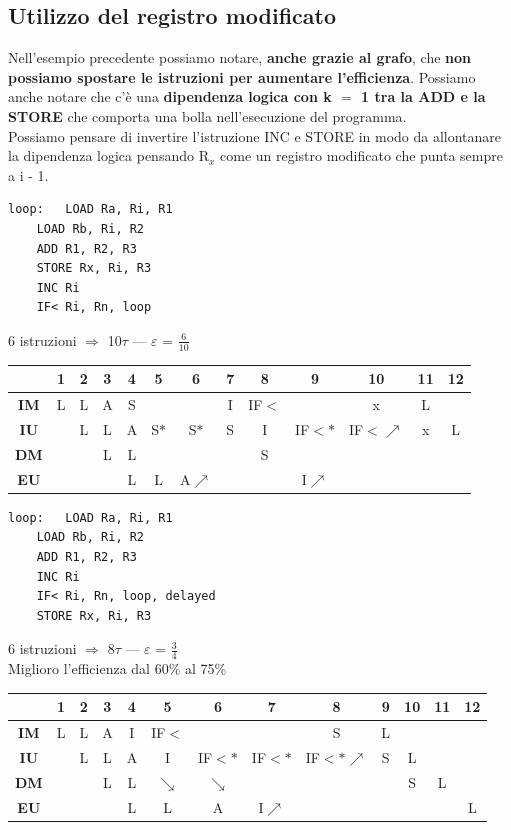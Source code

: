 \documentclass[10pt]{report}
\begin{document}
\subsection{Utilizzo del registro modificato}
Nell'esempio precedente possiamo notare, \textbf{anche grazie al grafo}, che \textbf{non possiamo spostare le istruzioni per aumentare l'efficienza}. Possiamo anche notare che c'è una \textbf{dipendenza logica con k $=$ 1 tra la ADD e la STORE} che comporta una bolla nell'esecuzione del programma.\\
Possiamo pensare di invertire l'istruzione INC e STORE in modo da allontanare la dipendenza logica pensando R$_x$ come un registro modificato che punta sempre a i - 1.
\begin{lstlisting}
loop:	LOAD Ra, Ri, R1
	LOAD Rb, Ri, R2
	ADD R1, R2, R3
	STORE Rx, Ri, R3
	INC Ri
	IF< Ri, Rn, loop
\end{lstlisting}
6 istruzioni $\Rightarrow$ 10$\tau$ --- $\varepsilon$ = $\frac{6}{10}$
\begin{center}
\begin{tabular}{c|c|c|c|c|c|c|c|c|c|c|c|c|}
 & 1 & 2 & 3 & 4 & 5 & 6 & 7 & 8 & 9 & 10 & 11 & 12 \\
\hline
\textbf{IM} & L & L & A & S & & & I & IF$<$ & & x & L & \\
\hline
\textbf{IU} & & L & L & A & S$*$ & S$*$ & S & I & IF$<*$ & IF$<\nearrow$ & x & L \\
\hline
\textbf{DM} & & & L & L & & & & S & & & & \\
\hline
\textbf{EU} & & & & L & L & A$\nearrow$ & & & I$\nearrow$ & & & \\
\hline
\end{tabular}
\end{center}
\begin{lstlisting}
loop:	LOAD Ra, Ri, R1
	LOAD Rb, Ri, R2
	ADD R1, R2, R3
	INC Ri
	IF< Ri, Rn, loop, delayed
	STORE Rx, Ri, R3
\end{lstlisting}
6 istruzioni $\Rightarrow$ 8$\tau$ --- $\varepsilon$ = $\frac{3}{4}$\\
Miglioro l'efficienza dal 60\% al 75\%
\begin{center}
\begin{tabular}{c|c|c|c|c|c|c|c|c|c|c|c|c|}
 & 1 & 2 & 3 & 4 & 5 & 6 & 7 & 8 & 9 & 10 & 11 & 12 \\
\hline
\textbf{IM} & L & L & A & I & IF$<$ & & & S & L & & & \\
\hline
\textbf{IU} & & L & L & A & I & IF$<*$ & IF$<*$ & IF$<*\nearrow$ & S & L & & \\
\hline
\textbf{DM} & & & L & L & $\searrow$ & $\searrow$ & & & & S & L & \\
\hline
\textbf{EU} & & & & L & L & A & I$\nearrow$ & & & & & L \\
\hline
\end{tabular}
\end{center}
\pagebreak
\end{document}
